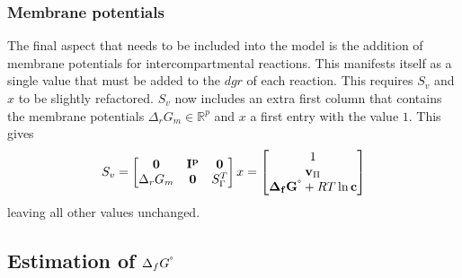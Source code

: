 \documentclass[10pt,letterpaper]{article}
\newcommand{\sdgf}{\Delta_fG^{\degree}}
\newcommand{\dgr}{\Delta_rG}
\newcommand{\bsdgf}{\mathbf{\sdgf}}
\newcommand{\bc}{\mathbf{c}}
\newcommand{\bv}{\mathbf{v}}
\begin{document}
\subsubsection{Membrane potentials}
The final aspect that needs to be included into the model is the addition of membrane potentials for intercompartmental reactions.
This manifests itself as a single value that must be added to the $dgr$ of each reaction.
This requires $S_v$ and $x$ to be slightly refactored.
$S_v$ now includes an extra first column that contains the membrane potentials $\dgr_m \in \mathbb{R}^p$ and $x$ a first entry with the value $1$.
This gives
\[
    S_v = \begin{bmatrix}
              \mathbf{0} & \mathbf{I^p} & \mathbf{0} \\
              \dgr_m & \mathbf{0} & S_{\Gamma}^T\\
          \end{bmatrix} \\
    x = \begin{bmatrix}
            1 \\
            \bv_\Pi \\
            \bsdgf + RT\ln{\bc} \\
        \end{bmatrix}
\]
leaving all other values unchanged.
\subsection{Estimation of $\sdgf$} \label{sec:sdgf_estimation}
\end{document}
